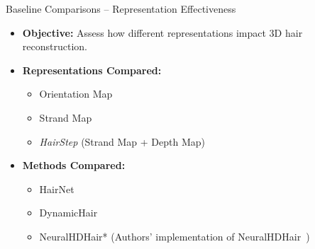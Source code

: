 \begin{frame}[t]{Baseline Comparisons -- Representation Effectiveness}
    \begin{itemize}
        \item \textbf{Objective:} Assess how different representations impact 3D hair reconstruction.
        \item \textbf{Representations Compared:}
        \begin{itemize}
            \item Orientation Map
            \item Strand Map
            \item \textit{HairStep} (Strand Map + Depth Map)
        \end{itemize}
        \item \textbf{Methods Compared:}
        \begin{itemize}
            \item HairNet~\cite{Zhou2018SingleViewHR}
            \item DynamicHair~\cite{Yang2019DynamicHM}
            \item NeuralHDHair* (Authors' implementation of NeuralHDHair~\cite{wu2022neuralhdhair})
        \end{itemize}
    \end{itemize}
\end{frame}

